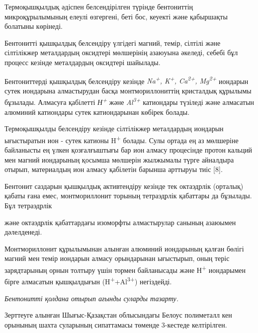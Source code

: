 \begin{multicols}{2}
Термоқышқылдық әдіспен белсендірілген түрінде бентониттің
микроқұрылымының елеулі өзгергені, беті бос, кеуекті және қабыршақты
болатыны көрінеді.

Бентонитті қышқылдық белсендіру үлгідегі магний, темір, сілтілі және
сілтілікжер металдардың оксидтері мөлшерінің азаюуына әкеледі, себебі
бұл процесс кезінде металдардың оксидтері шайылады.

Бентониттерді қышқылдық белсендіру кезінде \emph{Na\textsuperscript{+},
K\textsuperscript{+}, Ca\textsuperscript{2+}, Mg\textsuperscript{2+}}
иондарын сутек иондарына алмастырудан басқа монтмориллониттің кристалдық
құрылымы бұзылады. Алмасуға қабілетті \emph{Н\textsuperscript{+}} және
\emph{Al\textsuperscript{3+ }}катиондары түзіледі және алмасатын
алюминий катиондары сутек катиондарынан көбірек болады.

Термоқышқылды белсендіру кезінде сілтілікжер металдардың иондарын
ығыстыратын ион - сутек катионы H\textsuperscript{+} болады. Сулы ортада
ең аз мөлшеріне байланысты ең үлкен қозғалғыштығы бар ион алмасу
процесінде протон кальций мен магний иондарының қосымша мөлшерін
жылжымалы түрге айналдыра отырып, материалдың ион алмасу қабілетін
барынша арттыруы тиіс {[}8{]}.

Бентонит саздарын қышқылдық активтендіру кезінде тек октаэдрлік
(орталық) қабаты ғана емес, монтмориллонит торының тетраэдрлік қабаттары
да бұзылады. Бұл тетраэдрлік

және октаэдрлік қабаттардағы изоморфты алмастырулар санының азаюымен
дәлелденеді.

Монтмориллонит құрылымынан алынған алюминий иондарының қалған бөлігі
магний мен темір иондарын алмасу орындарынан ығыстырып, оның теріс
зарядтарының орнын толтыру үшін тормен байланысады және
Н\textsuperscript{+} иондарымен бірге алмасатын қышқылдығын
(H\textsuperscript{+}+Al\textsuperscript{3+}) негіздейді.

\emph{Бентонитті қолдана отырып ағынды суларды тазарту.}

Зерттеуге алынған Шығыс-Қазақстан облысындағы Белоус полиметалл кен
орынының шахта суларының сипаттамасы төменде 3-кестеде келтірілген.
\end{multicols}

